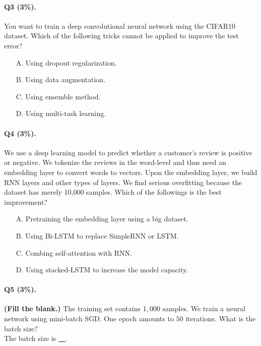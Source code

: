 \documentclass[11pt]{article}
\numberwithin{equation}{section}
\begin{document}
\paragraph{Q3 (3\%).} 
You want to train a deep convolutional neural network using the CIFAR10 dataset.
Which of the following tricks cannot be applied to improve the test error?
\begin{itemize}
	\item[A.]
	Using dropout regularization.
	\item[B.]
	Using data augmentation.
	\item[C.]
	Using ensemble method.
	\item[D.]
	Using multi-task learning.
\end{itemize}



\paragraph{Q4 (3\%).} 
We use a deep learning model to predict whether a customer's review is positive or negative.
We tokenize the reviews in the word-level and thus need an embedding layer to convert words to vectors.
Upon the embedding layer, we build RNN layers and other types of layers.
We find serious overfitting because the dataset has merely 10,000 samples.
Which of the followings is the best improvement?
\begin{itemize}
	\item[A.]
	Pretraining the embedding layer using a big dataset.
	\item[B.]
	Using Bi-LSTM to replace SimpleRNN or LSTM.
	\item[C.]
	Combing self-attention with RNN.
	\item[D.]
	Using stacked-LSTM to increase the model capacity.
\end{itemize}





\paragraph{Q5 (3\%).} 
{\bf (Fill the blank.)}
The training set contains $1,000$ samples.
We train a neural network using mini-batch SGD.
One epoch amounts to $50$ iterations.
What is the batch size? \\
The batch size is \underline{~\qquad\qquad\qquad~}. \\
\end{document}
